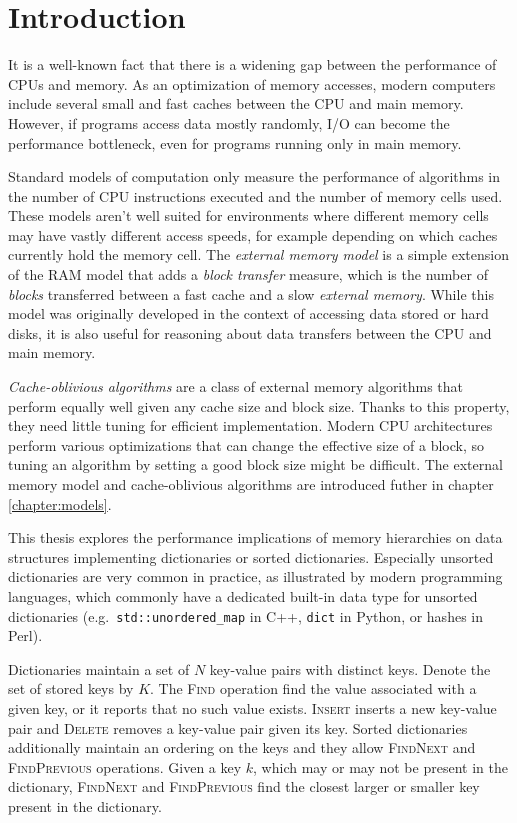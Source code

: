 \chapter*{Introduction}

It is a well-known fact that there is a widening gap between
the performance of CPUs and memory. As an optimization of memory accesses,
modern computers include several small and fast caches between the CPU and
main memory. However, if programs access data mostly randomly, I/O can become
the performance bottleneck, even for programs running only in main memory.

Standard models of computation only measure the performance of algorithms
in the number of CPU instructions executed and the number of memory cells used.
These models aren't well suited for environments where different memory cells
may have vastly different access speeds, for example depending on which caches
currently hold the memory cell. The \emph{external memory model} is a simple
extension of the RAM model that adds a \emph{block transfer} measure, which
is the number of \emph{blocks} transferred between a fast cache and a slow
\emph{external memory}. While this model was originally developed
in the context of accessing data stored or hard disks, it is also useful
for reasoning about data transfers between the CPU and main memory.

\emph{Cache-oblivious algorithms} are a class of external memory algorithms
that perform equally well given any cache size and block size. Thanks to this
property, they need little tuning for efficient implementation.
Modern CPU architectures perform various optimizations that can change
the effective size of a block, so tuning an algorithm by setting a good block
size might be difficult.
The external memory model and cache-oblivious algorithms are introduced futher
in chapter \ref{chapter:models}.

This thesis explores the performance implications of memory hierarchies
on data structures implementing dictionaries or sorted dictionaries.
Especially unsorted dictionaries are very common in practice, as illustrated
by modern programming languages, which commonly have a dedicated built-in
data type for unsorted dictionaries (e.g.\ \texttt{std::unordered\_map} in C++,
\texttt{dict} in Python, or hashes in Perl).

Dictionaries maintain a set of $N$ key-value pairs with distinct keys.
Denote the set of stored keys by $K$.
The \textsc{Find} operation find the value associated with a given key, or
it reports that no such value exists. \textsc{Insert} inserts a new
key-value pair and \textsc{Delete} removes a key-value pair given its key.
Sorted dictionaries additionally maintain an ordering on the keys and they
allow \textsc{FindNext} and \textsc{FindPrevious} operations.
Given a key $k$, which may or may not be present in the dictionary,
\textsc{FindNext} and \textsc{FindPrevious} find the closest larger or smaller
key present in the dictionary.

